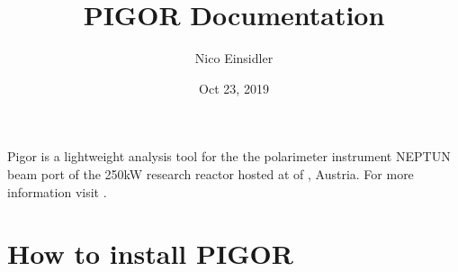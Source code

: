 \documentclass[letterpaper,10pt,english]{sphinxmanual}
\title{PIGOR Documentation}
\date{Oct 23, 2019}
\author{Nico Einsidler}
\begin{document}
\pagestyle{empty}
\sphinxmaketitle
\pagestyle{plain}
\sphinxtableofcontents
\pagestyle{normal}
\label{\detokenize{index::doc}}


Pigor is a lightweight analysis tool for the the polarimeter instrument NEPTUN beam port of the 250kW research reactor hosted at  of , Austria. For more information visit .


\chapter{How to install PIGOR}
\label{\detokenize{installation:how-to-install-pigor}}\label{\detokenize{installation::doc}}
\end{document}
